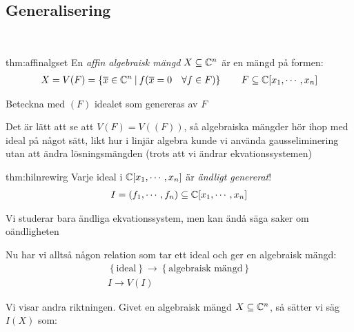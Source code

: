 \subsection{Generalisering}\hfill\\\par
\begin{theo}{thm:affinalgset}
  En \textit{affin algebraisk mängd} $X\subseteq \mathbb{C}^n$ är en mängd på formen:
  \begin{equation*}
    \begin{gathered}
      X = V(F) = \left\{\overline{x}\in\mathbb{C}^n\:|\: f(\overline{x}=0\quad\forall f\in F)\right\}\qquad F\subseteq\mathbb{C}[x_1,\cdots,x_n]
    \end{gathered}
  \end{equation*}\par
  \noindent Beteckna med $(F)$ idealet som genereras av $F$\par
  \noindent Det är lätt att se att $V(F) = V((F))$, så algebraiska mängder hör ihop med ideal på något sätt, likt hur i linjär algebra kunde vi använda gausseliminering utan att ändra lösningsmängden (trots att vi ändrar ekvationssystemen)
\end{theo}
\par\bigskip
\begin{theo}{thm:hilnrewirg}
  Varje ideal i $\mathbb{C}[x_1,\cdots,x_n]$ är \textit{ändligt genererat}!
  \begin{equation*}
    \begin{gathered}
      I =(f_1,\cdots,f_n)\subseteq\mathbb{C}[x_1,\cdots,x_n]
    \end{gathered}
  \end{equation*}\par
  \noindent Vi studerar bara ändliga ekvationssystem, men kan ändå säga saker om oändligheten
\end{theo}
\par\bigskip
\noindent Nu har vi alltså någon relation som tar ett ideal och ger en algebraisk mängd:
\begin{equation*}
  \begin{gathered}
    \left\{\text{ideal}\right\}\to\left\{\text{algebraisk mängd}\right\}\\
    I\to V(I)
  \end{gathered}
\end{equation*}\par
\noindent Vi visar andra riktningen. Givet en algebraisk mängd $X\subseteq \mathbb{C}^n$, så sätter vi säg $I(X)$ som:

